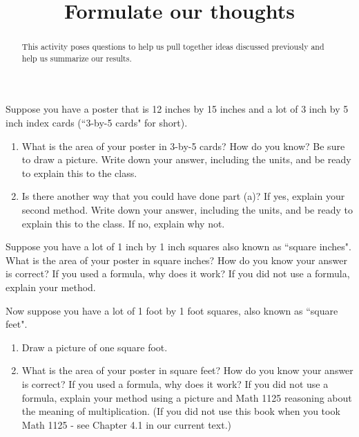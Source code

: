 \documentclass[nooutcomes,handout,noauthor]{ximera}
\title{Formulate our thoughts}
\begin{document}
\begin{abstract}
This activity poses questions to help us pull together ideas discussed previously and help us summarize our results.
\end{abstract}
\maketitle




\begin{problem}
Suppose you have a poster that is 12 inches by 15 inches and a lot of 3 inch by 5 inch index cards (``3-by-5 cards" for short).
\begin{enumerate}
    \item What is the area of your poster in 3-by-5 cards? How do you know?  Be sure to draw a picture.  Write down your answer, including the units, and be ready to explain this to the class.  

    \item Is there another way that you could have done part (a)? If yes, explain your second method. Write down your answer, including the units, and be ready to explain this to the class. If no, explain why not.
\end{enumerate}

\end{problem}


\begin{problem} 
Suppose you have a lot of 1 inch by 1 inch squares also known as ``square inches". What is the area of your poster in square inches? How do you know your answer is correct?  If you used a formula, why does it work?  If you did not use a formula, explain your method.

\end{problem}



\begin{problem}
Now suppose you have a lot of 1 foot by 1 foot squares, also known as ``square feet". 

 \begin{enumerate}
\item Draw a picture of one square foot.
\vskip 1in
\item What is the area of your poster in square feet? How do you know your answer is correct?  If you used a formula, why does it work?  If you did not use a formula, explain your method using a picture and Math 1125 reasoning about the meaning of multiplication. (If you did not use this book when you took Math 1125 - see Chapter 4.1 in our current text.)
\end{enumerate}

\end{problem}
\end{document}
